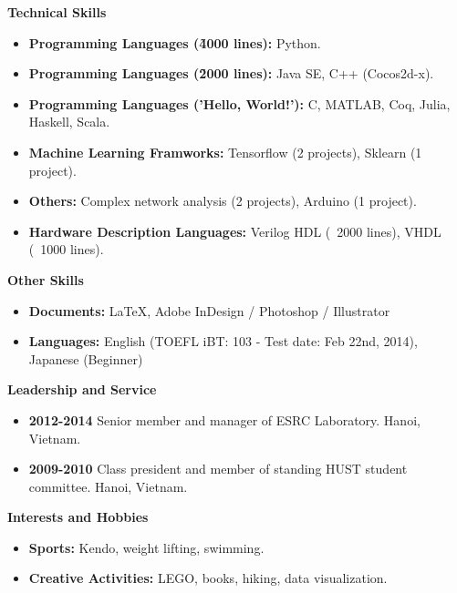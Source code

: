 \documentclass[letter,11pt]{article}
\newcommand{\resheading}[1]{{\large \colorbox{mygrey}{\begin{minipage}{\textwidth}{\textbf{#1 \vphantom{p\^{E}}}}\end{minipage}}}}
\begin{document}
\resheading{Technical Skills}
\begin{itemize}
\item
    \textbf{Programming Languages (\~4000 lines):} Python.
\item
    \textbf{Programming Languages (\~2000 lines):} Java SE, C++ (Cocos2d-x).
\item 
    \textbf{Programming Languages ('Hello, World!'):} C, MATLAB, Coq, Julia, Haskell, Scala.
\item
    \textbf{Machine Learning Framworks:} Tensorflow (2 projects), Sklearn (1 project).
\item
    \textbf{Others:} Complex network analysis (2 projects), Arduino (1 project).
\item
    \textbf{Hardware Description Languages:} Verilog HDL (~2000 lines), VHDL (~1000 lines).
\end{itemize}

\resheading{Other Skills}
\begin{itemize}
\item
\textbf{Documents:} \LaTeX, Adobe InDesign / Photoshop / Illustrator
\item
\textbf{Languages:} English (TOEFL iBT: 103 - Test date: Feb 22nd, 2014), Japanese (Beginner)
\end{itemize}

\resheading{Leadership and Service}
\begin{itemize}
\item
    \textbf{2012-2014} Senior member and manager of ESRC Laboratory. Hanoi, Vietnam.
\item
    \textbf{2009-2010} Class president and member of standing HUST student committee. Hanoi, Vietnam.
\end{itemize}

\resheading{Interests and Hobbies}
\begin{itemize}
\item
\textbf{Sports:} Kendo, weight lifting, swimming.
\item
\textbf{Creative Activities:} LEGO, books, hiking, data visualization.
\end{itemize}
\end{document}
